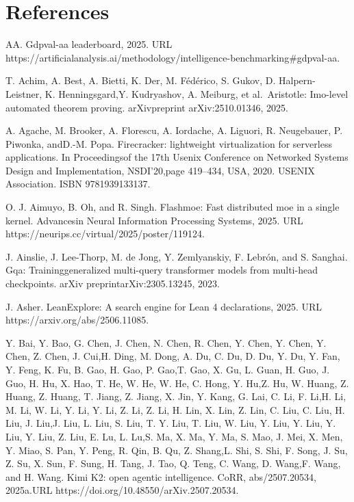 \documentclass[
  10
]{article}
\author{}
\date{}
\begin{document}







\section*{References}\label{references}

AA. Gdpval-aa leaderboard, 2025. URL
https://artificialanalysis.ai/methodology/intelligence-benchmarking\#gdpval-aa.

T. Achim, A. Best, A. Bietti, K. Der, M. Fédérico, S. Gukov, D.
Halpern-Leistner, K. Henningsgard,Y. Kudryashov, A. Meiburg, et
al.~Aristotle: Imo-level automated theorem proving. arXivpreprint
arXiv:2510.01346, 2025.

A. Agache, M. Brooker, A. Florescu, A. Iordache, A. Liguori, R.
Neugebauer, P. Piwonka, andD.-M. Popa. Firecracker: lightweight
virtualization for serverless applications. In Proceedingsof the 17th
Usenix Conference on Networked Systems Design and Implementation,
NSDI'20,page 419--434, USA, 2020. USENIX Association. ISBN
9781939133137.

O. J. Aimuyo, B. Oh, and R. Singh. Flashmoe: Fast distributed moe in a
single kernel. Advancesin Neural Information Processing Systems, 2025.
URL https://neurips.cc/virtual/2025/poster/119124.

J. Ainslie, J. Lee-Thorp, M. de Jong, Y. Zemlyanskiy, F. Lebrón, and S.
Sanghai. Gqa: Traininggeneralized multi-query transformer models from
multi-head checkpoints. arXiv preprintarXiv:2305.13245, 2023.

J. Asher. LeanExplore: A search engine for Lean 4 declarations, 2025.
URL https://arxiv.org/abs/2506.11085.

Y. Bai, Y. Bao, G. Chen, J. Chen, N. Chen, R. Chen, Y. Chen, Y. Chen, Y.
Chen, Z. Chen, J. Cui,H. Ding, M. Dong, A. Du, C. Du, D. Du, Y. Du, Y.
Fan, Y. Feng, K. Fu, B. Gao, H. Gao, P. Gao,T. Gao, X. Gu, L. Guan, H.
Guo, J. Guo, H. Hu, X. Hao, T. He, W. He, W. He, C. Hong, Y. Hu,Z. Hu,
W. Huang, Z. Huang, Z. Huang, T. Jiang, Z. Jiang, X. Jin, Y. Kang, G.
Lai, C. Li, F. Li,H. Li, M. Li, W. Li, Y. Li, Y. Li, Z. Li, Z. Li, H.
Lin, X. Lin, Z. Lin, C. Liu, C. Liu, H. Liu, J. Liu,J. Liu, L. Liu, S.
Liu, T. Y. Liu, T. Liu, W. Liu, Y. Liu, Y. Liu, Y. Liu, Y. Liu, Z. Liu,
E. Lu, L. Lu,S. Ma, X. Ma, Y. Ma, S. Mao, J. Mei, X. Men, Y. Miao, S.
Pan, Y. Peng, R. Qin, B. Qu, Z. Shang,L. Shi, S. Shi, F. Song, J. Su, Z.
Su, X. Sun, F. Sung, H. Tang, J. Tao, Q. Teng, C. Wang, D. Wang,F. Wang,
and H. Wang. Kimi K2: open agentic intelligence. CoRR, abs/2507.20534,
2025a.URL https://doi.org/10.48550/arXiv.2507.20534.
\end{document}
